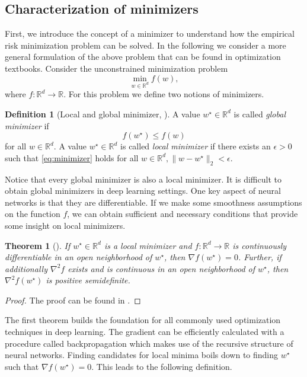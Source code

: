 \documentclass[12pt]{article}
\newtheorem{theorem}{Theorem}[section]
\theoremstyle{definition}
\newtheorem{definition}[definition]{Definition}
\numberwithin{equation}{section}
\newcommand{\norm}[1]{\lVert{#1}\rVert_2}
\begin{document}
\subsection{Characterization of minimizers}
First, we introduce the concept of a minimizer to understand how the empirical risk minimization problem can be solved. In the following we consider a more general formulation of the above problem that can be found in optimization textbooks. Consider the unconstrained minimization problem
\begin{equation}
  \min_{w \in \mathbb{R}^d} f(w),
\end{equation}
where $f:\mathbb{R}^d \rightarrow \mathbb{R}$.
For this problem we define two notions of minimizers.
\begin{definition}[Local and global minimizer, ]
  A value $w^\star \in \mathbb{R}^d$ is called \emph{global minimizer} if 
  \begin{equation}
    \label{eq:minimizer}
    f(w^\star) \leq f(w)
  \end{equation} 
  for all $w \in \mathbb{R}^d$. A value $w^\star \in \mathbb{R}^d$ is called \emph{local minimizer} if there exists an $\epsilon > 0$ such that \eqref{eq:minimizer} holds for all $w \in \mathbb{R}^d, \norm{w-w^\star} < \epsilon$.
\end{definition}
Notice that every global minimizer is also a local minimizer. It is difficult to obtain global minimizers in deep learning settings. One key aspect of neural networks is that they are differentiable. If we make some smoothness assumptions on the function $f$, we can obtain sufficient and necessary conditions that provide some insight on local minimizers.
\begin{theorem}[]
  If $w^\star \in \mathbb{R}^d$ is a local minimizer and $f:\mathbb{R}^d \rightarrow \mathbb{R}$ is continuously differentiable in an open neighborhood of $w^\star$, then $\nabla f(w^\star) = 0$. Further, if additionally $\nabla^2 f$ exists and is continuous in an open neighborhood of $w^\star$, then $\nabla^2f(w^\star)$ is positive semidefinite.
\end{theorem}
\begin{proof}
  The proof can be found in \autocite{nocedalNumericalOptimization2006}.
\end{proof}
The first theorem builds the foundation for all commonly used optimization techniques in deep learning. The gradient can be  efficiently calculated with a procedure called backpropagation which makes use of the recursive structure of neural networks. Finding candidates for local minima boils down to finding $w^\star$ such that $\nabla f(w^\star) = 0$. This leads to the following definition.
\end{document}
